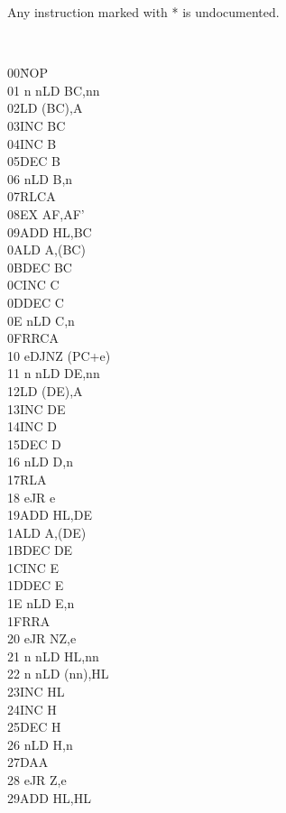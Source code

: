\documentclass[oneside,a4paper]{book}
\begin{document}
Any instruction marked with * is undocumented.
\begin{multicols}{3}

\scriptsize
{\tt
\begin{tabbing}
00{\qquad}{\qquad}{\quad}\=NOP\\
01 n n\>LD BC,nn\\
02\>LD (BC),A\\
03\>INC BC\\
04\>INC B\\
05\>DEC B\\
06 n\>LD B,n\\
07\>RLCA\\
08\>EX AF,AF'\\
09\>ADD HL,BC\\
0A\>LD A,(BC)\\
0B\>DEC BC\\
0C\>INC C\\
0D\>DEC C\\
0E n\>LD C,n\\
0F\>RRCA\\
10 e\>DJNZ (PC+e)\\
11 n n\>LD DE,nn\\
12\>LD (DE),A\\
13\>INC DE\\
14\>INC D\\
15\>DEC D\\
16 n\>LD D,n\\
17\>RLA\\
18 e\>JR e\\
19\>ADD HL,DE\\
1A\>LD A,(DE)\\
1B\>DEC DE\\
1C\>INC E\\
1D\>DEC E\\
1E n\>LD E,n\\
1F\>RRA\\
20 e\>JR NZ,e\\
21 n n\>LD HL,nn\\
22 n n\>LD (nn),HL\\
23\>INC HL\\
24\>INC H\\
25\>DEC H\\
26 n\>LD H,n\\
27\>DAA\\
28 e\>JR Z,e\\
29\>ADD HL,HL\\

\end{tabbing}}
\end{multicols}
\end{document}
